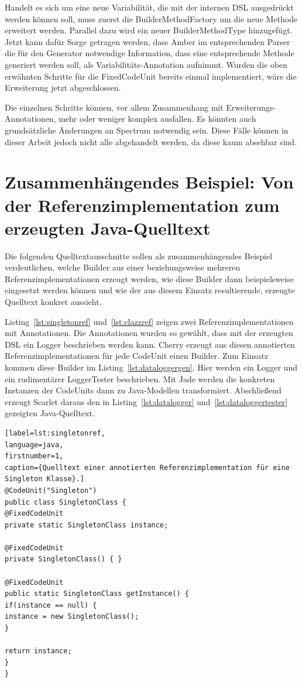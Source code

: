 \documentclass[12pt,oneside,a4paper,parskip]{scrbook}
\begin{document}
Handelt es sich um eine neue Variabilität, die mit der internen DSL ausgedrückt werden können soll, muss zuerst die BuilderMethodFactory um die neue Methode erweitert werden. Parallel dazu wird ein neuer BuilderMethodType hinzugefügt. Jetzt kann dafür Sorge getragen werden, dass Amber im entsprechenden Parser die für den Generator notwendige Information, dass eine entsprechende Methode generiert werden soll, als Variabilitäts-Annotation aufnimmt. Wurden die oben erwähnten Schritte für die FixedCodeUnit bereits einmal implementiert, wäre die Erweiterung jetzt abgeschlossen.

Die einzelnen Schritte können, vor allem Zusammenhang mit Erweiterungs-Annotationen, mehr oder weniger komplex ausfallen. Es könnten auch grundsätzliche Änderungen an Spectrum notwendig sein. Diese Fälle können in dieser Arbeit jedoch nicht alle abgehandelt werden, da diese kaum absehbar sind.

\section{Zusammenhängendes Beispiel: Von der Referenzimplementation zum erzeugten Java-Quelltext}

Die folgenden Quelltextausschnitte sollen als zusammenhängendes Beispiel verdeutlichen, welche Builder aus einer beziehungsweise mehreren Referenzimplementationen erzeugt werden, wie diese Builder dann beispielsweise eingesetzt werden können und wie der aus diesem Einsatz resultierende, erzeugte Quelltext konkret aussieht.

Listing~\ref{lst:singletonref} und~\ref{lst:clazzref} zeigen zwei Referenzimplementationen mit Annotationen. Die Annotationen wurden so gewählt, dass mit der erzeugten DSL ein Logger beschrieben werden kann. Cherry erzeugt aus diesen annotierten Referenzimplementationen für jede CodeUnit einen Builder. Zum Einsatz kommen diese Builder im Listing~\ref{lst:dataloggergen}. Hier werden ein Logger und ein rudimentärer LoggerTester beschrieben. Mit Jade werden die konkreten Instanzen der CodeUnits dann zu Java-Modellen transformiert. Abschließend erzeugt Scarlet daraus den in Listing~\ref{lst:datalogger} und~\ref{lst:dataloggertester} gezeigten Java-Quelltext.

\begin{lstlisting}[label=lst:singletonref,
language=java,
firstnumber=1,
caption={Quelltext einer annotierten Referenzimplementation für eine Singleton Klasse}.]
@CodeUnit("Singleton")
public class SingletonClass {
@FixedCodeUnit
private static SingletonClass instance;

@FixedCodeUnit
private SingletonClass() { }

@FixedCodeUnit
public static SingletonClass getInstance() {
if(instance == null) {
instance = new SingletonClass();
}

return instance;
}
}
\end{lstlisting}
\end{document}
